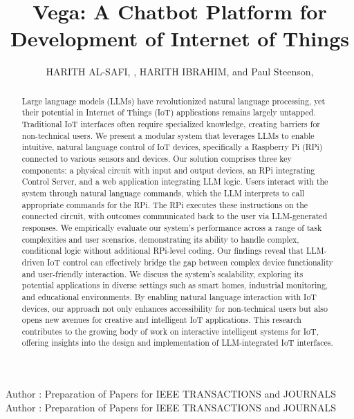 \documentclass{ieeeaccess}
\begin{document}

\title{Vega: A Chatbot Platform for Development of Internet of Things}
\author{\uppercase{Harith Al-Safi}, ,
    \uppercase{Harith Ibrahim}, and Paul Steenson,
    }

\address{School of Electronics and Electrical Engineering, University of Leeds,
    Leeds LS2 9JT, U.K}

\markboth
{Author \headeretal: Preparation of Papers for IEEE TRANSACTIONS and JOURNALS}
{Author \headeretal: Preparation of Papers for IEEE TRANSACTIONS and JOURNALS}


\begin{abstract}
    Large language models (LLMs) have revolutionized natural language
    processing, yet their potential in Internet of Things (IoT) applications
    remains largely untapped. Traditional IoT interfaces often require specialized
    knowledge, creating barriers for non-technical users. We present a modular
    system that leverages LLMs to enable intuitive, natural language control of IoT
    devices, specifically a Raspberry Pi (RPi) connected to various sensors and
    devices. Our solution comprises three key components: a physical circuit with
    input and output devices, an RPi integrating Control Server, and a web
    application integrating LLM logic. Users interact with the system through
    natural language commands, which the LLM interprets to call appropriate
    commands for the RPi. The RPi executes these instructions on the connected
    circuit, with outcomes communicated back to the user via LLM-generated
    responses. We empirically evaluate our system's performance across a range of
    task complexities and user scenarios, demonstrating its ability to handle
    complex, conditional logic without additional RPi-level coding. Our findings
    reveal that LLM-driven IoT control can effectively bridge the gap between
    complex device functionality and user-friendly interaction. We discuss the
    system's scalability, exploring its potential applications in diverse settings
    such as smart homes, industrial monitoring, and educational environments. By
    enabling natural language interaction with IoT devices, our approach not only
    enhances accessibility for non-technical users but also opens new avenues for
    creative and intelligent IoT applications. This research contributes to the
    growing body of work on interactive intelligent systems for IoT, offering
    insights into the design and implementation of LLM-integrated IoT interfaces.
\end{abstract}
\end{document}
